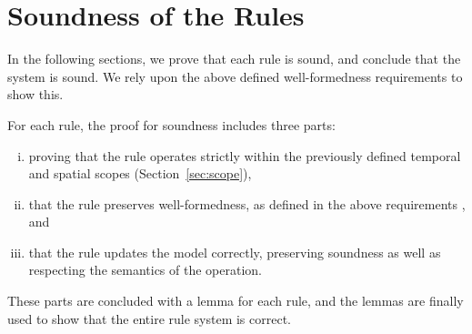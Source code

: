 \section{Soundness of the Rules}
\label{sec:soundness-of-the-rules}
In the following sections, we prove that each rule is sound, and conclude that the system is sound. We rely upon the above defined well-formedness requirements  to show this.

For each rule, the proof for soundness includes three parts: 
\begin{enumerate}[(i)]
   \item proving that the rule operates strictly within the previously defined temporal and spatial scopes (Section~\vref{sec:scope}), 
   \item that the rule preserves well-formedness, as defined in the above requirements , and
   \item that the rule updates the model correctly, preserving soundness as well as respecting the semantics of the operation.
\end{enumerate}

These parts are concluded with a lemma for each rule, and the lemmas are finally used to show that the entire rule system is correct.
